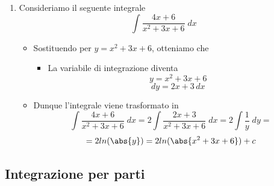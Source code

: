 \documentclass[a4paper, 12pt]{report}
\begin{document}
\begin{enumerate}
        \begin{itemize}
        \item Gli estremi dell'intervallo diventano $[13, 21]$
        \item Sostituendo per $y=2x+15$, otteniamo che
            \begin{itemize}
                \item La variabile di integrazione diventa
                \[ y = 2x+15\]
                \[ dy = 3 \, dx\]
                \[ \frac{dy}{2} = dx\]
            \end{itemize}
            
        \item Dunque l'integrale viene trasformato in
        \[ \int_{13}^{21} \frac{1}{y} \frac{dy}{3} = \frac{1}{3} \int_{13}^{21} \frac{1}{y} \; dy = \left . \frac{ln (\abs{y})}{3} \right |_{13}^{21} = \frac{ln(21)-ln(13)}{3}\]
        
        \end{itemize}
        
        \item Consideriamo il seguente integrale
        \[ \int \frac{4x+6}{x^2+3x+6} \; dx\]
        
        \begin{itemize}
        \item Sostituendo per $y=x^2+3x+6$, otteniamo che
            \begin{itemize}
                \item La variabile di integrazione diventa
                \[ y = x^2+3x+6\]
                \[ dy = 2x+3 \, dx\]
            \end{itemize}
            
        \item Dunque l'integrale viene trasformato in
        \[ \int \frac{4x+6}{x^2+3x+6} \; dx = 2 \int \frac{2x+3}{x^2+3x+6} \; dx = 2\int \frac{1}{y} \; dy = \]
        \[ = 2ln(\abs{y}) = 2ln(\abs{x^2+3x+6})+c\]
        
        \end{itemize}
        
    \end{enumerate}
    
    \newpage
    
    \subsection{Integrazione per parti}
    
\end{document}
